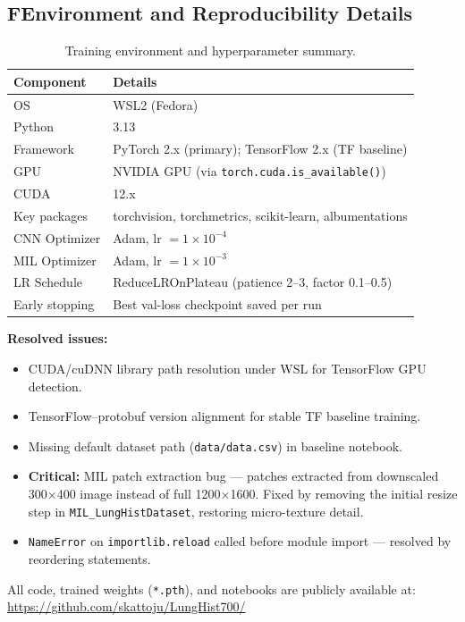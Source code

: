 \documentclass[10pt,twocolumn,letterpaper]{article}
\begin{document}
\subsection*{F\quad Environment and Reproducibility Details}

\begin{table}[h]
\centering
\caption{Training environment and hyperparameter summary.}
\setlength{\tabcolsep}{6pt}
\begin{tabular}{ll}
\toprule
Component & Details \\
\midrule
OS                  & WSL2 (Fedora) \\
Python              & 3.13 \\
Framework           & PyTorch 2.x (primary); TensorFlow 2.x (TF baseline) \\
GPU                 & NVIDIA GPU (via \texttt{torch.cuda.is\_available()}) \\
CUDA                & 12.x \\
Key packages        & torchvision, torchmetrics, scikit-learn, albumentations \\
CNN Optimizer       & Adam, lr $= 1\times10^{-4}$ \\
MIL Optimizer       & Adam, lr $= 1\times10^{-3}$ \\
LR Schedule         & ReduceLROnPlateau (patience 2–3, factor 0.1–0.5) \\
Early stopping      & Best val-loss checkpoint saved per run \\
\bottomrule
\end{tabular}
\label{tab:env}
\end{table}

\noindent\textbf{Resolved issues:}
\begin{itemize}
\item CUDA/cuDNN library path resolution under WSL for TensorFlow GPU detection.
\item TensorFlow--protobuf version alignment for stable TF baseline training.
\item Missing default dataset path (\texttt{data/data.csv}) in baseline notebook.
\item \textbf{Critical:} MIL patch extraction bug — patches extracted from downscaled 300$\times$400 image instead of full 1200$\times$1600. Fixed by removing the initial resize step in \texttt{MIL\_LungHistDataset}, restoring micro-texture detail.
\item \texttt{NameError} on \texttt{importlib.reload} called before module import — resolved by reordering statements.
\end{itemize}

\noindent All code, trained weights (\texttt{*.pth}), and notebooks are publicly available at:
\url{https://github.com/skattoju/LungHist700/}
\end{document}

